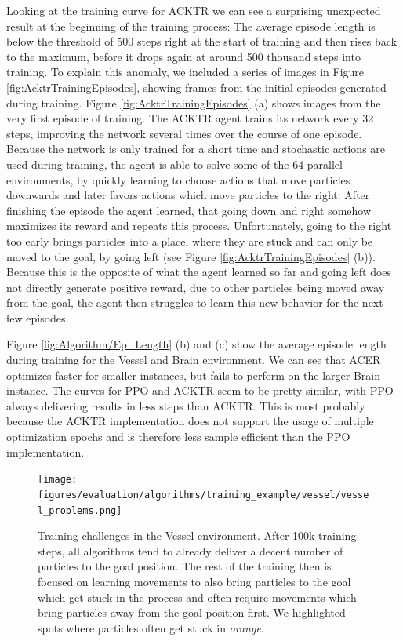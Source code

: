 Looking at the training curve for ACKTR we can see a surprising unexpected result at the beginning of the training process: The average episode length is below the threshold of 500 steps right at the start of training and then rises back to the maximum, before it drops again at around 500 thousand steps into training. To explain this anomaly, we included a series of images in Figure \ref{fig:AcktrTrainingEpisodes}, showing frames from the initial episodes generated during training. Figure \ref{fig:AcktrTrainingEpisodes} (a) shows images from the very first episode of training. The ACKTR agent trains its network every 32 steps, improving the network several times over the course of one episode. Because the network is only trained for a short time and stochastic actions are used during training, the agent is able to solve some of the 64 parallel environments, by quickly learning to choose actions that move particles downwards and later favors actions which move particles to the right. After finishing the episode the agent learned, that going down and right somehow maximizes its reward and repeats this process. Unfortunately, going to the right too early brings particles into a place, where they are stuck and can only be moved to the goal, by going left (see Figure \ref{fig:AcktrTrainingEpisodes} (b)). Because this is the opposite of what the agent learned so far and going left does not directly generate positive reward, due to other particles being moved away from the goal, the agent then struggles to learn this new behavior for the next few episodes.

Figure \ref{fig:Algorithm/Ep_Length} (b) and (c) show the average episode length during training for the Vessel and Brain environment. We can see that ACER optimizes faster for smaller instances, but fails to perform on the larger Brain instance. The curves for PPO and ACKTR seem to be pretty similar, with PPO always delivering results in less steps than ACKTR. This is most probably because the ACKTR implementation does not support the usage of multiple optimization epochs and is therefore less sample efficient than the PPO implementation. 

\begin{figure} [htp]
    \begin{center}
        \texttt{[image: figures/evaluation/algorithms/training\_example/vessel/vessel\_problems.png]}
    \end{center}
    \caption[Training Challenges in the Vessel Environment]{Training challenges in the Vessel environment. After 100k training steps, all algorithms tend to already deliver a decent number of particles to the goal position. The rest of the training then is focused on learning movements to also bring particles to the goal which get stuck in the process and often require movements which bring particles away from the goal position first. We highlighted spots where particles often get stuck in \textit{orange}.} \label{fig:Algorithm/Problems/Vessel}
\end{figure}


